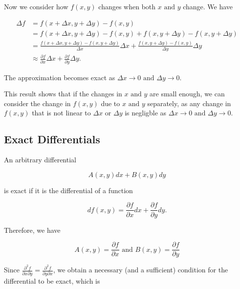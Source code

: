 \documentclass[english,a4paper,12pt]{report}
\begin{document}
Now we consider how \(f(x,y)\) changes when both \(x \text { and } y\) change. We have

\begin{equation} \label{totaldf} 
    \begin{aligned}
        \Delta f &= f(x+\Delta x,y+\Delta y) - f(x,y) \\
        &= f(x+\Delta x,y+\Delta y) - f(x,y) + f(x,y+\Delta y) - f(x,y+\Delta y) \\
        &= \frac{f(x+\Delta x,y+\Delta y)-f(x,y+\Delta y)}{\Delta x}\Delta x + \frac{f(x,y+\Delta y)-f(x,y)}{\Delta y} \Delta y \\
        &\approx \frac{\partial f}{\partial x} \Delta x + \frac{\partial f}{\partial y} \Delta y. 
    \end{aligned}
\end{equation}

The approximation becomes exact as \(\Delta x \rightarrow  0 \text { and }  \Delta y \rightarrow 0\). 

This result shows that if the changes in \(x \text { and } y\) are small enough, we can consider the change in \(f(x,y)\) due to \(x \text { and } y\) separately, as any change in \(f(x,y)\) that is not linear to \(\Delta x \text { or } \Delta y\) is negligble as \(\Delta x \rightarrow 0 \text { and } \Delta y \rightarrow 0\).     


\subsection{Exact Differentials}

An arbitrary differential 

\begin{equation}
    A(x,y) dx + B(x,y) dy
\end{equation}

is exact if it is the differential of a function 

\begin{equation}
    df(x,y) = \frac{\partial f}{\partial x} dx + \frac{\partial f}{\partial y} dy.
\end{equation}

Therefore, we have

\begin{equation}
    A(x,y) = \frac{\partial f}{\partial x} \text { and } B(x,y) = \frac{\partial f}{\partial y}
\end{equation}

Since \(\frac{\partial^2 f}{\partial x \partial y} = \frac{\partial^2 f}{\partial y \partial x}\), we obtain a necessary (and a sufficient) condition for the differential to be exact, which is
\end{document}
